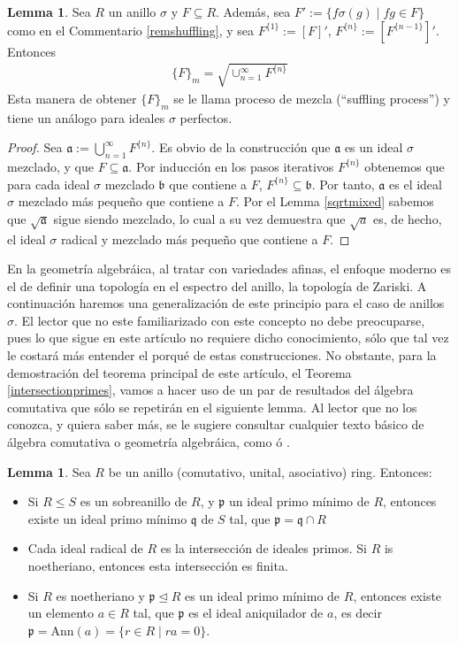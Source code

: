 \documentclass[12pt,a4paper,BCOR15mm,twoside,DIV12]{article}
\def\a{\mathfrak{a}}
\def\b{\mathfrak{b}}
\def\p{\mathfrak{p}}
\def\q{\mathfrak{q}}
\def\s{\sigma}
\theoremstyle{definition}
\newtheorem{lem}[Satz]{Lemma}
\begin{document}
\begin{lem}\label{lemsuffling}
Sea $R$ un anillo $\s$ y $F \subseteq R$. Además, sea $F' := \{f\s(g) \mid fg \in F \}$ como en el Commentario \ref{remshuffling}, y sea $F^{\{1\}}:= [F]'$, $F^{\{n\}}:= [F^{\{n-1\}}]'$. Entonces
\begin{align} \{F\}_m = \sqrt{\cup_{n=1}^{\infty} F^{\{n\}}} \end{align}
Esta manera de obtener $\{F\}_m$ se le llama proceso de mezcla (``suffling process'') y tiene un análogo para ideales $\s$ perfectos. 
\begin{proof}
Sea $\a:= \bigcup_{n=1}^{\infty} F^{\{n\}}$. Es obvio de la construcción que $\a$ es un ideal $\s$ mezclado, y que $F \subseteq \a$. 
Por inducción en los pasos iterativos $F^{\{n\}}$ obtenemos que para cada ideal $\s$ mezclado $\b$ que contiene a $F$, $F^{\{n\}} \subseteq \b$. Por tanto, $\a$ es el ideal $\s$ mezclado más pequeño que contiene a $F$.
Por el Lemma \ref{sqrtmixed} sabemos que $\sqrt{\a}$ sigue siendo mezclado, lo cual a su vez demuestra que $\sqrt a$ es, de hecho, el ideal $\s$ radical y mezclado más pequeño que contiene a $F$. 
\end{proof}
\end{lem}

En la geometría algebráica, al tratar con variedades afinas, el enfoque moderno es el de definir una topología en el espectro del anillo, la topología de Zariski.
A continuación haremos una generalización de este principio para el caso de anillos $\s$. El lector que no este familiarizado con este concepto no debe preocuparse, 
pues lo que sigue en este artículo no requiere dicho conocimiento, sólo que tal vez le costará más entender el porqué de estas construcciones. 
No obstante, para la demostración del teorema principal de este artículo, el Teorema \ref{intersectionprimes}, vamos a hacer uso de un par de resultados del álgebra comutativa
que sólo se repetirán en el siguiente lemma. Al lector que no los conozca, y quiera saber más, se le sugiere consultar cualquier texto básico de álgebra comutativa o geometría algebráica,
como \cite{eisenbud} ó \cite{hartshorne}.

\begin{lem}\label{commalg}
Sea $R$ be un anillo (comutativo, unital, asociativo) ring. Entonces:
\begin{itemize}
\item Si $R \leq S$ es un sobreanillo de $R$, y $\p$ un ideal primo mínimo de $R$, entonces existe un ideal primo mínimo $\q$ de $S$ tal, que $\p = \q \cap R$
\item Cada ideal radical de $R$ es la intersección de ideales primos. Si $R$ is noetheriano, entonces esta intersección es finita.
\item Si $R$ es noetheriano y $\p \unlhd R$ es un ideal primo mínimo de $R$, entonces existe un elemento $a \in R$ tal, que $\p$ es el ideal aniquilador de $a$, es decir $\p = \text{Ann}(a) = \{ r \in R \mid ra = 0 \}$.
\end{itemize}
\end{lem}
\end{document}
